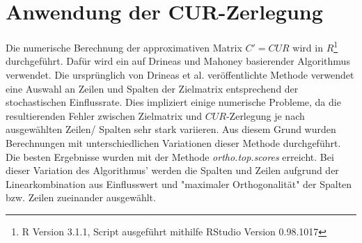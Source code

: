 \documentclass[12pt,a4paper,twoside]{article}
\begin{document}
\section{Anwendung der CUR-Zerlegung}
	Die numerische Berechnung der approximativen Matrix $C'=CUR$ wird in $R$\footnote{R Version 3.1.1, Script ausgeführt mithilfe RStudio Version 0.98.1017} durchgeführt. Dafür wird ein auf Drineas und Mahoney \citep{mahoney2008} basierender Algorithmus \citep{bodor2012} verwendet. \newline
	Die ursprünglich von Drineas et al. \citep{mahoney2008} veröffentlichte Methode verwendet eine Auswahl an Zeilen 
	und Spalten der Zielmatrix entsprechend der stochastischen Einflussrate. Dies impliziert einige numerische 
	Probleme, da die resultierenden Fehler zwischen Zielmatrix und $CUR$-Zerlegung je nach ausgewählten Zeilen/
	Spalten sehr stark variieren. Aus diesem Grund wurden Berechnungen mit unterschiedlichen Variationen dieser 
	Methode durchgeführt. \newline
	Die besten Ergebnisse wurden mit der Methode \textit{ortho.top.scores} erreicht. Bei dieser Variation des Algorithmus' werden die Spalten und Zeilen aufgrund der Linearkombination aus Einflusswert und "maximaler Orthogonalität" der Spalten bzw. Zeilen zueinander ausgewählt. \\
\end{document}
